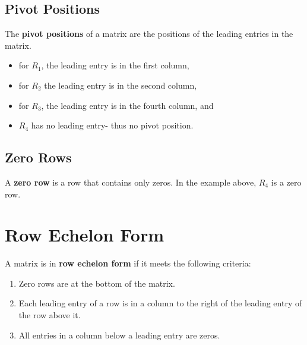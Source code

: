 \documentclass[
  letterpaper,
  DIV=11,
  numbers=noendperiod]{scrreprt}
\providecommand{\tightlist}{%
  \setlength{\itemsep}{0pt}\setlength{\parskip}{0pt}}\usepackage{longtable,booktabs,array}
\begin{document}
\hypertarget{pivot-positions}{%
\subsection*{Pivot Positions}\label{pivot-positions}}

The \textbf{pivot positions} of a matrix are the positions of the
leading entries in the matrix.

\begin{itemize}
\tightlist
\item
  for \(R_1\), the leading entry is in the first column,
\item
  for \(R_2\) the leading entry is in the second column,\\
\item
  for \(R_3\), the leading entry is in the fourth column, and
\item
  \(R_4\) has no leading entry- thus no pivot position.
\end{itemize}

\hypertarget{zero-rows}{%
\subsection*{Zero Rows}\label{zero-rows}}

A \textbf{zero row} is a row that contains only zeros. In the example
above, \(R_4\) is a zero row.

\hypertarget{row-echelon-form}{%
\section*{Row Echelon Form}\label{row-echelon-form}}


A matrix is in \textbf{row echelon form} if it meets the following
criteria:

\begin{enumerate}
\def\labelenumi{\arabic{enumi}.}
\tightlist
\item
  Zero rows are at the bottom of the matrix.
\item
  Each leading entry of a row is in a column to the right of the leading
  entry of the row above it.
\item
  All entries in a column below a leading entry are zeros.
\end{enumerate}
\end{document}
